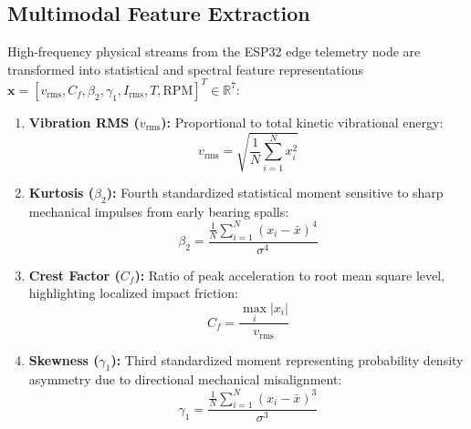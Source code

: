 \documentclass[12pt,a4paper,oneside]{report}
\begin{document}
\subsection{Multimodal Feature Extraction}
High-frequency physical streams from the ESP32 edge telemetry node are transformed into statistical and spectral feature representations $\mathbf{x} = [v_{\text{rms}}, C_f, \beta_2, \gamma_1, I_{\text{rms}}, T, \text{RPM}]^T \in \mathbb{R}^7$:
\begin{enumerate}[label=\textbf{\alph*.}]
    \item \textbf{Vibration RMS ($v_{\text{rms}}$):} Proportional to total kinetic vibrational energy:
    \begin{equation}
        v_{\text{rms}} = \sqrt{\frac{1}{N}\sum_{i=1}^N x_i^2}
    \end{equation}
    \item \textbf{Kurtosis ($\beta_2$):} Fourth standardized statistical moment sensitive to sharp mechanical impulses from early bearing spalls:
    \begin{equation}
        \beta_2 = \frac{\frac{1}{N}\sum_{i=1}^N (x_i - \bar{x})^4}{\sigma^4}
    \end{equation}
    \item \textbf{Crest Factor ($C_f$):} Ratio of peak acceleration to root mean square level, highlighting localized impact friction:
    \begin{equation}
        C_f = \frac{\max_{i} |x_i|}{v_{\text{rms}}}
    \end{equation}
    \item \textbf{Skewness ($\gamma_1$):} Third standardized moment representing probability density asymmetry due to directional mechanical misalignment:
    \begin{equation}
        \gamma_1 = \frac{\frac{1}{N}\sum_{i=1}^N (x_i - \bar{x})^3}{\sigma^3}
    \end{equation}
\end{enumerate}
\end{document}
